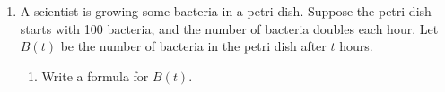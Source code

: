 \documentclass{article}
\begin{document}
\begin{enumerate}[resume, topsep=0pt]
\begin{enumerate}
  \item
    \begin{problem}[\vfill]
      $\dfrac{(3a)^{2x} - \left( a^2 \right)^x}{\sqrt{a^x a^{3x}}}$ where $a > 0$
    \end{problem}

    \begin{align*}
       \frac{(3a)^{2x} - \left( a^2 \right)^x}{\sqrt{a^x a^{3x}}} &=
       \frac{3^{2x}a^{2x} - a^{2x}}{(a^{4x})^{1/2}} \\
       &= \frac{a^{2x}(3^{2x}-1)}{a^{2x}} \\
       &= \boxed{3^{2x} -1}
    \end{align*}

  \item

    \begin{problem}[\vfill]
      $\displaystyle \frac{2^{3x} + \sqrt{9 \cdot 6^{4x}}}{4^x}$ 
    \end{problem}

    \begin{solution}
      \begin{align*}
        \frac{2^{3x} + \sqrt{9 \cdot 6^{4x}}}{4^x} &= \frac{2^{3x} +
          \sqrt{9} \sqrt{6^{4x}}}{4^x} \\
        &= \frac{2^{3x} + 3 \sqrt{6^{4x}}}{4^x} \\
        &= \frac{2^{3x}}{4^x} + 3 \frac{\sqrt{6^{4x}}}{4^x} \\
        &= \frac{8^x}{4^x} + 3 \frac{6^{2x}}{4^x} \\
        &= \left( \frac{8}{4} \right)^x + 3 \frac{ (6^2)^x}{4^x} \\
        &= 2^x + 3 \left( \frac{6^2}{4} \right)^x \\
        &= \boxed{2^x + 3 \cdot 9^x}
      \end{align*}
    \end{solution}

  \end{enumerate}

\item \label{bacteria}

  A scientist is growing some bacteria in a petri dish. Suppose the petri dish starts with 100 bacteria, and the number of bacteria doubles each hour. Let $B(t)$ be the number of bacteria in the petri dish after $t$ hours.
  \begin{enumerate}
  \item
    \begin{problem}[1in]
      Write a formula for $B(t)$. 
    \end{problem}


\end{enumerate}
\end{enumerate}
\end{document}
